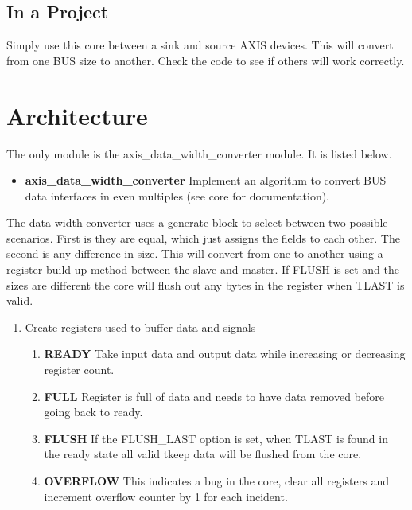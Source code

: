 \subsection{In a Project}
\par
Simply use this core between a sink and source AXIS devices. This will convert from one BUS size to another. Check the code to see if others will work correctly.

\section{Architecture}
\par
The only module is the axis\_data\_width\_converter module. It is listed below.

\begin{itemize}
  \item \textbf{axis\_data\_width\_converter } Implement an algorithm to convert BUS data interfaces in even multiples (see core for documentation).
\end{itemize}

\par
The data width converter uses a generate block to select between two possible scenarios. First is they are equal, which just assigns the fields to each other.
The second is any difference in size. This will convert from one to another using a register build up method between the slave and master. If FLUSH is set and
the sizes are different the core will flush out any bytes in the register when TLAST is valid.

\par
\begin{enumerate}
\item Create registers used to buffer data and signals
  \begin{enumerate}
    \item \textbf{READY} Take input data and output data while increasing or decreasing register count.
    \item \textbf{FULL} Register is full of data and needs to have data removed before going back to ready.
    \item \textbf{FLUSH} If the FLUSH\_LAST option is set, when TLAST is found in the ready state all valid tkeep data will be flushed from the core.
    \item \textbf{OVERFLOW} This indicates a bug in the core, clear all registers and increment overflow counter by 1 for each incident.
  \end{enumerate}
\end{enumerate}

